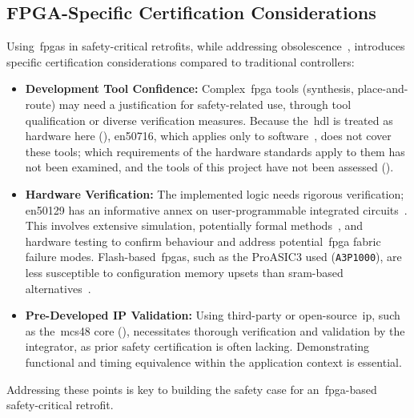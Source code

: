 \subsection{FPGA-Specific Certification Considerations}
\label{subsec:fpga_certification}
Using~\glspl{fpga} in safety-critical retrofits, while addressing obsolescence~\cite{guzman2011obsolescence}, introduces specific certification considerations compared to traditional controllers:
\begin{itemize}
	\item \textbf{Development Tool Confidence:} Complex~\gls{fpga} tools (synthesis, place-and-route) may need a justification for safety-related use, through tool qualification or diverse verification measures. Because the~\gls{hdl} is treated as hardware here (), \gls{en50716}, which applies only to software~\cite{en50716_2023}, does not cover these tools; which requirements of the hardware standards apply to them has not been examined, and the tools of this project have not been assessed ().
	\item \textbf{Hardware Verification:} The implemented logic needs rigorous verification; \gls{en50129} has an informative annex on user-programmable integrated circuits~\cite{en50129_2018}. This involves extensive simulation, potentially formal methods~\cite{formal_verification_rail_2023}, and hardware testing to confirm behaviour and address potential~\gls{fpga} fabric failure modes. Flash-based~\glspl{fpga}, such as the ProASIC3 used (\texttt{A3P1000}), are less susceptible to configuration memory upsets than \gls{sram}-based alternatives~\cite{guzman2011obsolescence, poivey2011proasic3}.
	\item \textbf{Pre-Developed IP Validation:} Using third-party or open-source~\gls{ip}, such as the~\gls{mcs48} core (), necessitates thorough verification and validation by the integrator, as prior safety certification is often lacking. Demonstrating functional and timing equivalence within the application context is essential.
\end{itemize}
Addressing these points is key to building the safety case for an~\gls{fpga}-based safety-critical retrofit.

